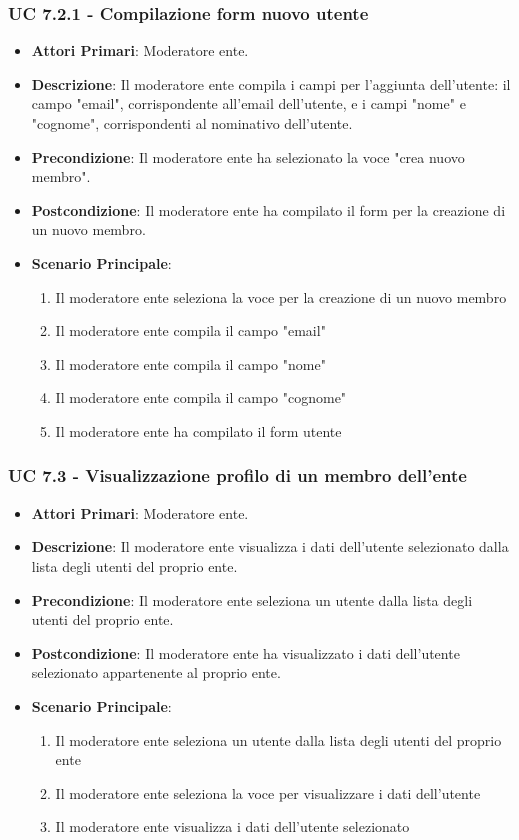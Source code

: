 			\subsubsection{UC 7.2.1 - Compilazione form nuovo utente}
			\begin{itemize}
				\item \textbf{Attori Primari}: Moderatore ente.
				\item \textbf{Descrizione}: Il moderatore ente compila i campi per l'aggiunta dell'utente: il campo "email", corrispondente all'email dell'utente, e i campi "nome" e "cognome", corrispondenti al nominativo dell'utente.
				\item \textbf{Precondizione}: Il moderatore ente ha selezionato la voce "crea nuovo membro".
				\item \textbf{Postcondizione}: Il moderatore ente ha compilato il form per la creazione di un nuovo membro.
				\item \textbf{Scenario Principale}:
				\begin{enumerate}
					\item{Il moderatore ente seleziona la voce per la creazione di un nuovo membro}
					\item{Il moderatore ente compila il campo "email"}
					\item{Il moderatore ente compila il campo "nome"}
					\item{Il moderatore ente compila il campo "cognome"}
					\item{Il moderatore ente ha compilato il form utente}
				\end{enumerate}	
			\end{itemize}

			\subsubsection{UC 7.3 - Visualizzazione profilo di un membro dell'ente}
			\begin{itemize}
				\item \textbf{Attori Primari}: Moderatore ente.
				\item \textbf{Descrizione}: Il moderatore ente visualizza i dati dell'utente selezionato dalla lista degli utenti del proprio ente.
				\item \textbf{Precondizione}: Il moderatore ente seleziona un utente dalla lista degli utenti del proprio ente.
				\item \textbf{Postcondizione}: Il moderatore ente ha visualizzato i dati dell'utente selezionato appartenente al proprio ente.
				\item \textbf{Scenario Principale}:
				\begin{enumerate}
					\item{Il moderatore ente seleziona un utente dalla lista degli utenti del proprio ente}
					\item{Il moderatore ente seleziona la voce per visualizzare i dati dell'utente}
					\item{Il moderatore ente visualizza i dati dell'utente selezionato}
				\end{enumerate}
			\end{itemize}


